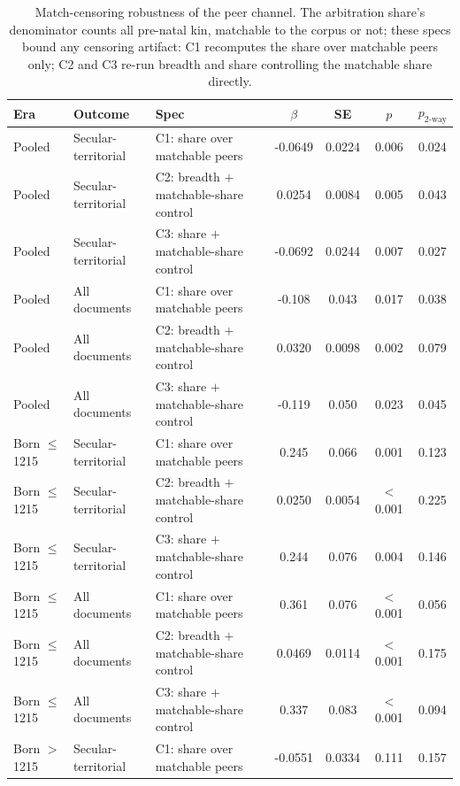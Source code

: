 \documentclass[12pt]{article}
\theoremstyle{definition}
\theoremstyle{remark}
\begin{document}
\begin{table}[t]
\centering
\caption{Match-censoring robustness of the peer channel. The arbitration share's denominator counts all pre-natal kin, matchable to the corpus or not; these specs bound any censoring artifact: C1 recomputes the share over matchable peers only; C2 and C3 re-run breadth and share controlling the matchable share directly.}
\label{tab:app_censoring}
{\footnotesize\setlength{\tabcolsep}{4pt}
\begin{tabular}{lllcccc}
\toprule
Era & Outcome & Spec & $\beta$ & SE & $p$ & $p_{\text{2-way}}$ \\
\midrule
Pooled & Secular-territorial & C1: share over matchable peers & -0.0649 & 0.0224 & 0.006 & 0.024 \\
Pooled & Secular-territorial & C2: breadth $+$ matchable-share control & 0.0254 & 0.0084 & 0.005 & 0.043 \\
Pooled & Secular-territorial & C3: share $+$ matchable-share control & -0.0692 & 0.0244 & 0.007 & 0.027 \\
Pooled & All documents & C1: share over matchable peers & -0.108 & 0.043 & 0.017 & 0.038 \\
Pooled & All documents & C2: breadth $+$ matchable-share control & 0.0320 & 0.0098 & 0.002 & 0.079 \\
Pooled & All documents & C3: share $+$ matchable-share control & -0.119 & 0.050 & 0.023 & 0.045 \\
\addlinespace
Born $\leq$1215 & Secular-territorial & C1: share over matchable peers & 0.245 & 0.066 & 0.001 & 0.123 \\
Born $\leq$1215 & Secular-territorial & C2: breadth $+$ matchable-share control & 0.0250 & 0.0054 & $<$0.001 & 0.225 \\
Born $\leq$1215 & Secular-territorial & C3: share $+$ matchable-share control & 0.244 & 0.076 & 0.004 & 0.146 \\
Born $\leq$1215 & All documents & C1: share over matchable peers & 0.361 & 0.076 & $<$0.001 & 0.056 \\
Born $\leq$1215 & All documents & C2: breadth $+$ matchable-share control & 0.0469 & 0.0114 & $<$0.001 & 0.175 \\
Born $\leq$1215 & All documents & C3: share $+$ matchable-share control & 0.337 & 0.083 & $<$0.001 & 0.094 \\
\addlinespace
Born $>$1215 & Secular-territorial & C1: share over matchable peers & -0.0551 & 0.0334 & 0.111 & 0.157 \\

\end{tabular}}
\end{table}
\end{document}
